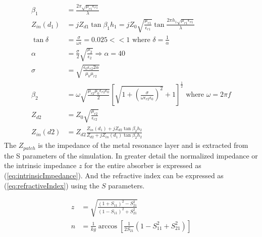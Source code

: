             \begin{subequations}
                \label{eq:Zin}
                \begin{align}
                    \beta_1 & = \frac{2\pi\sqrt{\mu_{r1}\epsilon_{r1}}}{\lambda} \label{eq:beta_1} \\
                    Z_{in}(d_1) & = jZ_{d1}\tan{\beta_1h_1} = jZ_0\sqrt{\frac{\mu_{r1}}{\epsilon_{r1}}}
                            \tan{\frac{2\pi h_1\sqrt{\mu_{r1}\epsilon_{r1}}}{\lambda}} \label{eq:Zin_d1} \\
                    \tan{\delta} & = \frac{\sigma}{\omega\epsilon} = 0.025 << 1
                        \textrm{ where } \delta = \frac{1}{\alpha} \label{eq:lossTangent} \\
                    \alpha & = \frac{\sigma}{2}\sqrt{\frac{\mu_2}{\epsilon_2}} \Rightarrow \alpha = 40 \label{eq:alpha} \\
                    \sigma & = \sqrt{\frac{\epsilon_0\epsilon_{r2}2\alpha}{\mu_0\mu_{r2}}} \label{eq:sigma} \\
                    \beta_2 & = \omega\sqrt{\frac{\mu_{r2}\mu_0\epsilon_{r2}\epsilon_0}{2}}
                        \left[
                            \sqrt{1+\left(\frac{\sigma}{\omega\epsilon_{r2}\epsilon_0}\right)^2}+1
                        \right]^\frac{1}{2} \textrm{ where } \omega = 2\pi f \label{eq:beta_2} \\
                    Z_{d2} & = Z_0\sqrt{\frac{\mu_{r2}}{\epsilon_{r2}}} \label{eq:Zd2} \\
                    Z_{in}(d2) & = Z_{d2}\frac{Z_{in}(d_1)+jZ_{d2}\tan{\beta_2h_2}}
                        {Z_{d2}+jZ_{in}(d_1)\tan{\beta_2h_2}} \label{eq:Zin_d2}
                \end{align} 
            \end{subequations}
            The $Z_{patch}$ is the impedance of the metal resonance layer and is 
            extracted from the S parameters of the simulation. In greater detail 
            the normalized impedance or the intrinsic impedance $z$ for the entire 
            absorber is expressed as (\ref{eq:intrinsicImpedance}). And the 
            refractive index can be expressed as (\ref{eq:refractiveIndex}) using
            the $S$ parameters.

            \begin{subequations}
                \label{eq:Impedance}
                \begin{align}
                    z & = \sqrt{\frac{(1 + S_{11})^2 - S_{21}^2}{(1 - S_{11})^2 + S_{21}^2}} \label{eq:intrinsicImpedance} \\
                    n & = \frac{1}{kg}\arccos{\left[\frac{1}{2S_{21}}(1-S_{11}^2+S_{21}^2)\right]} \label{eq:refractiveIndex}
                \end{align}
            \end{subequations}
            

